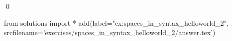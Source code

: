 
\begin{ex} 
  \label{ex:spaces_in_syntax_helloworld_2}
  
  \qed
\end{ex} 
\begin{python0}
from solutions import *
add(label="ex:spaces_in_syntax_helloworld_2",
    srcfilename='exercises/spaces_in_syntax_helloworld_2/answer.tex') 
\end{python0}
